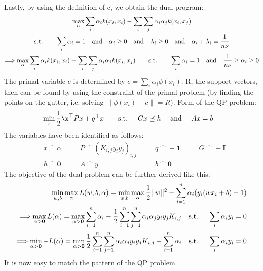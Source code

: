 \documentclass[a4paper]{article}
\newcommand{\norm}[1]{\left\lVert#1\right\rVert}
\newcommand{\xt}{{\x^\top}}
\newcommand{\1}{\mathds{1}}
\begin{document}
Lastly, by using the definition of c, we obtain the dual program:
\begin{gather*}
	\max_\alpha \sum_i \alpha_i k(x_i,x_i) - \sum_i\sum_j\alpha_i\alpha_j k(x_i,x_j)
	\\
	\text{s.t.} \quad\quad
	\sum_i\alpha_i = 1
	\quad\text{and} \quad
	\alpha_i \geq 0
	\quad\text{and} \quad
	\lambda_i \geq 0
	\quad\text{and} \quad
	\alpha_i + \lambda_i = {1\over n\nu}
	\\
	\Longrightarrow
	\max_\alpha \sum_i \alpha_i k(x_i,x_i) - \sum_i\sum_j\alpha_i\alpha_j k(x_i,x_j)
	\quad\quad\text{s.t.} \quad\quad
	\sum_i\alpha_i = 1
	\quad\text{and} \quad
	{1\over n\nu} \geq \alpha_i \geq 0
\end{gather*}
The primal variable c is determined by $c=\sum_i\alpha_i\phi(x_i)$.
R, the support vectors, then can be found by using the constraint of the primal problem 
(by finding the points on the gutter, i.e. solving $\norm{\phi(x_i)-c} = R$).
\newpage
{}
Form of the QP problem:
\begin{align*}
	\min_x {1\over 2}\xt Px + q^\top x \quad\quad & \text{s.t. }\quad Gx\preceq h
	 \quad \text{ and }\quad Ax=b  
\end{align*}
The variables have been identified as follows:
\begin{align*}
	& x\hat{=}\alpha & \quad & P\hat{=}(K_{i,j}y_i y_j)_{i,j} & \quad & 
	q\hat{=}-\textbf{1} & \quad & G\hat{=} -\textbf{I} \\
	&h\hat{=}\textbf{0} & \quad & A\hat{=}y & \quad & b\hat{=}\textbf{0}
\end{align*} 
The objective of the dual problem can be further derived like this:
\begin{align*}
	\min_{w,b}\max_\alpha L(w,b,\alpha) 
	= \min_{w,b}\max_\alpha{1\over 2}||{w}||^2 - \sum_{i=1}^n \alpha_i(y_i(wx_i+b)-1) \\ 
	\Longrightarrow
	\max_{\alpha >\textbf{0}} L(\alpha) = \max_{\alpha >\textbf{0}} \sum_{i=1}^n \alpha_i - {1\over 2}\sum_{i=1}^n \sum_{j=1}^n \alpha_i \alpha_j y_i y_j
	K_{i,j} \quad \text{s.t. } \quad \sum_i \alpha_i y_i = 0
	\\
	\Longrightarrow
	\min_{\alpha >\textbf{0}} -L(\alpha) = \min_{\alpha >\textbf{0}} {1\over 2}\sum_{i=1}^n \sum_{j=1}^n \alpha_i \alpha_j y_i y_j K_{i,j} - \sum_{i=1}^n \alpha_i
	\quad \text{s.t. } \quad \sum_i \alpha_i y_i = 0  
\end{align*} 
It is now easy to match the pattern of the QP problem.
\end{document}
